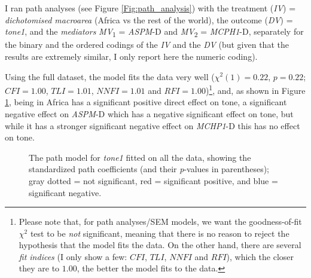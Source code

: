 \documentclass[twoside,twocolumn]{article}
\begin{document}
I ran path analyses (see Figure \ref{Fig:path_analysis}) with the treatment (\textit{IV}) = \textit{dichotomised macroarea} (Africa vs the rest of the world), the outcome (\textit{DV}) = \textit{tone1}, and the \textit{mediators} \textit{MV}\textsubscript{1} = \textit{ASPM}-D and \textit{MV}\textsubscript{2} = \textit{MCPH1}-D, separately for the binary and the ordered codings of the \textit{IV} and the \textit{DV} (but given that the results are extremely similar, I only report here the numeric coding).

Using the full dataset, the model fits the data very well ($\chi^2(1) = 0.22$, $p = 0.22$; $CFI=1.00$, $TLI=1.01$, $NNFI=1.01$ and $RFI=1.00$)\footnote{Please note that, for path analyses/SEM models, we want the goodness-of-fit $\chi^2$ test to be \emph{not} significant, meaning that there is no reason to reject the hypothesis that the model fits the data. On the other hand, there are several \emph{fit indices} (I only show a few: $CFI$, $TLI$, $NNFI$ and $RFI$), which the closer they are to $1.00$, the better the model fits to the data.}, and, as shown in Figure \ref{Fig:tone1_path_all}, being in Africa has a significant positive direct effect on tone, a significant negative effect on \textit{ASPM}-D which has a negative significant effect on tone, but while it has a stronger significant negative effect on \textit{MCHP1}-D this has no effect on tone.

\begin{figure}[h]
  \centering


  \caption{The path model for \textit{tone1} fitted on all the data, showing the standardized path coefficients (and their \textit{p}-values in parentheses); gray dotted = not significant, red = significant positive, and blue = significant negative. }
  \label{Fig:tone1_path_all}
\end{figure}
\end{document}
